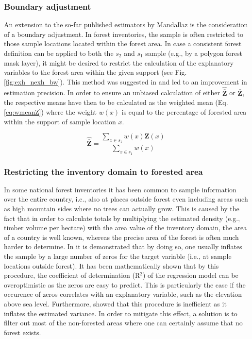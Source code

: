 \documentclass[article]{jss}
\begin{document}
\subsubsection{Boundary adjustment}

An extension to the so-far published estimators by Mandallaz is the consideration of a boundary adjustment. In forest inventories, the sample is often restricted to those sample locations located within the forest area. In case a consistent forest definition can be applied to both the $s_2$ and $s_1$ sample (e.g., by a polygon forest mask layer), it might be desired to restrict the calculation of the explanatory variables to the forest area within the given support (see Fig. \ref{fig:exh_nexh_bw}). This method was suggested in \citet{mandallaz2013b} and led to an improvement in estimation precision. In order to ensure an unbiased calculation of either $\hat{\bar{\pmb{Z}}}$ or $\bar{\pmb{Z}}$, the respective means have then to be calculated as the weighted mean (Eq. \ref{eq:wmeanZ}) where the weight $w(x)$ is equal to the percentage of forested area within the support of sample location $x$.

\begin{equation}\label{eq:wmeanZ}
  \hat{\bar{\pmb{Z}}}=\frac{\sum_{x\in{s_1}}w(x)\pmb{Z}(x)}{\sum_{x\in{s_1}}w(x)}
\end{equation}


\subsubsection{Restricting the inventory domain to forested area}

In some national forest inventories it has been common to sample information over the entire country, i.e., also at places outside forest even including areas such as high mountain sides where no trees can actually grow. This is caused by the fact that in order to calculate totals by multiplying the estimated density (e.g., timber volume per hectare) with the area value of the inventory domain, the area of a country is well known, whereas the precise area of the forest is often much harder to determine. In \citet{mandallaz2014} it is demonstrated that by doing so, one usually inflates the sample by a large number of zeros for the target variable (i.e., at sample locations outside forest). It has been mathematically shown that by this procedure, the coefficient of determination (R$^2$) of the regression model can be overoptimistic as the zeros are easy to predict. This is particularly the case if the occurence of zeros correlates with an explanatory variable, such as the elevation above sea level. Furthermore, \citet{mandallaz2014} showed that this procedure is inefficient as it inflates the estimated variance. In order to mitigate this effect, a solution is to filter out most of the non-forested areas where one can certainly assume that no forest exists.
\end{document}
